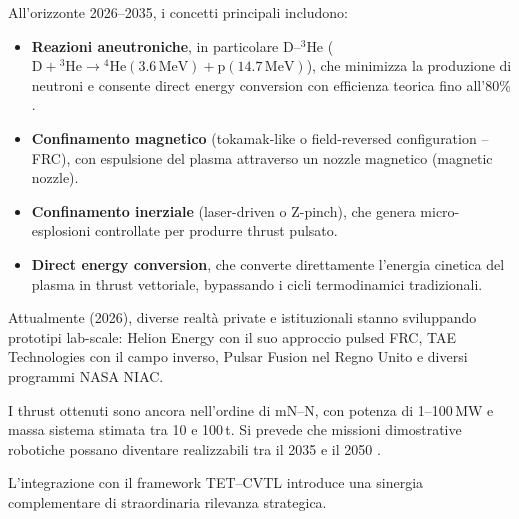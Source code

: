 \documentclass[11pt,a4paper]{article}
\let\oldcite\cite
\renewcommand{\cite}{\protect\oldcite}
\theoremstyle{plain}
\theoremstyle{definition}
\begin{document}
All’orizzonte 2026–2035, i concetti principali includono:

\vspace{0.2cm}
\begin{itemize}
    \item \textbf{Reazioni aneutroniche}, in particolare D--$^3$He ($\mathrm{D} + {}^3\mathrm{He} \to {}^4\mathrm{He} (3.6\,\mathrm{MeV}) + \mathrm{p} (14.7\,\mathrm{MeV})$), che minimizza la produzione di neutroni e consente direct energy conversion con efficienza teorica fino all’80\% \cite{borowski_2012, slough_2019}.

    \vspace{0.2cm}
    \item \textbf{Confinamento magnetico} (tokamak-like o field-reversed configuration – FRC), con espulsione del plasma attraverso un nozzle magnetico (magnetic nozzle).

    \vspace{0.2cm}
    \item \textbf{Confinamento inerziale} (laser-driven o Z-pinch), che genera micro-esplosioni controllate per produrre thrust pulsato.

    \vspace{0.2cm}
    \item \textbf{Direct energy conversion}, che converte direttamente l’energia cinetica del plasma in thrust vettoriale, bypassando i cicli termodinamici tradizionali.
\end{itemize}

\vspace{0.4cm}

Attualmente (2026), diverse realtà private e istituzionali stanno sviluppando prototipi lab-scale: Helion Energy con il suo approccio pulsed FRC, TAE Technologies con il campo inverso, Pulsar Fusion nel Regno Unito e diversi programmi NASA NIAC. 

\vspace{0.2cm}


I thrust ottenuti sono ancora nell’ordine di mN–N, con potenza di 1–100\,MW e massa sistema stimata tra 10 e 100\,t. Si prevede che missioni dimostrative robotiche possano diventare realizzabili tra il 2035 e il 2050 \cite{tae_2025, helion_2025, nasa_niac_2024}.

\vspace{0.4cm}

L’integrazione con il framework TET--CVTL introduce una sinergia complementare di straordinaria rilevanza strategica. 
\end{document}

